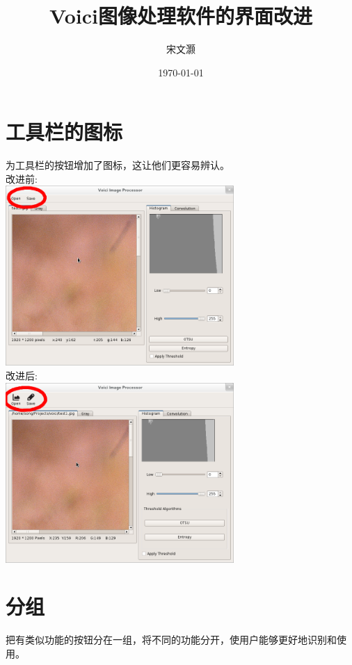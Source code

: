 \documentclass[10pt,a4paper]{article}
\begin{document}
\title{Voici图像处理软件的界面改进}
\author{宋文灏}
\date{\today}
\maketitle
\section{工具栏的图标}
为工具栏的按钮增加了图标，这让他们更容易辨认。\\

改进前:\\
\indent\includegraphics[width=0.65\textwidth]{icon_origin.png}\\

改进后:\\
\indent\includegraphics[width=0.65\textwidth]{icon_improved.png}

\pagebreak


\section{分组}
把有类似功能的按钮分在一组，将不同的功能分开，使用户能够更好地识别和使用。\\
\end{document}
